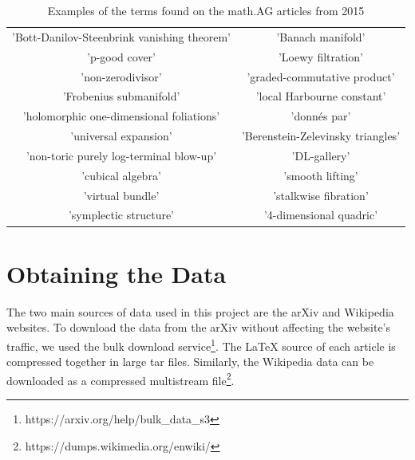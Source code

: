 \documentclass[a4paper]{easychair}
\begin{document}
\begin{table}[h]
    \sffamily
    \centering
    \begin{tabular}{cc}
        'Bott-Danilov-Steenbrink vanishing theorem' &

        'Banach manifold' \\

 'p-good cover'&

        'Loewy filtration' \\

 'non-zerodivisor'&

 'graded-commutative product'\\

        'Frobenius submanifold' &

 'local Harbourne constant'\\

        'holomorphic one-dimensional foliations' &

 'donnés par'\\

        'universal expansion' &

 'Berenstein-Zelevinsky triangles'\\

        'non-toric purely log-terminal blow-up' &

 'DL-gallery'\\

        'cubical algebra' &

 'smooth lifting'\\

        'virtual bundle' &

 'stalkwise fibration'\\

        'symplectic structure' &

 '4-dimensional quadric'\\
    \end{tabular}
    \caption{\label{sample}Examples of the terms found on the math.AG articles from 2015}
\end{table}
\section{Obtaining the Data}
The two main sources of data used in this project are the arXiv and Wikipedia websites. To download the data from the arXiv without affecting the website's traffic, we used the bulk download service\footnote{https://arxiv.org/help/bulk\_data\_s3}. The \LaTeX{} source of each article is compressed together in large tar files. Similarly, the Wikipedia data can be downloaded as a compressed multistream file\footnote{https://dumps.wikimedia.org/enwiki/}. 
\end{document}
